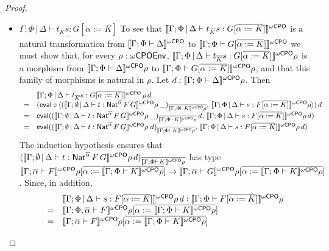 \documentclass[acmsmall,review,anonymous]{acmart}
\theoremstyle{definition}
\begin{document}
\begin{proof}
\begin{itemize}
\item 
$\underline{\Gamma;\Phi \,|\, \Delta \vdash t_{\overline K} s: G
  [\overline{\alpha := K}]}$\; 
  To see that $\llbracket{\Gamma;\Phi \,|\,
  \Delta \vdash t_{\overline K} s: G [\overline{\alpha := K}]}\rrbracket^{{\omega\mathsf{CPO}}}$ is a
  natural transformation from $\llbracket{\Gamma; \Phi \vdash \Delta}\rrbracket^{{\omega\mathsf{CPO}}}$ to
  $\llbracket{\Gamma;\Phi \vdash G [\overline{\alpha := K}]}\rrbracket^{{\omega\mathsf{CPO}}}$ we must
  show that, for every $\rho : \omega\mathsf{CPOEnv}$, $\llbracket{\Gamma;\Phi \,|\,
    \Delta \vdash t_{\overline K} s: G [\overline{\alpha := K}]}\rrbracket^{{\omega\mathsf{CPO}}}\rho$
  is a morphism from $\llbracket{\Gamma; \Phi \vdash \Delta}\rrbracket^{{\omega\mathsf{CPO}}}\rho$ to
  $\llbracket{\Gamma;\Phi \vdash G [\overline{\alpha := K}]}\rrbracket^{{\omega\mathsf{CPO}}}\rho$, and
  that this family of morphisms is natural in $\rho$. Let $d :
  \llbracket{\Gamma; \Phi \vdash \Delta}\rrbracket^{{\omega\mathsf{CPO}}}\rho$. Then
  \[\begin{array}{ll}
  & \llbracket{\Gamma;\Phi \,|\, \Delta \vdash t_{\overline K} s: G
  [\overline{\alpha := K}]}\rrbracket^{{\omega\mathsf{CPO}}}\,\rho\,d\\
= & (\mathsf{eval} \circ \langle (\llbracket{\Gamma; \emptyset \,|\, \Delta \vdash
  t : \mathsf{Nat}^{\overline{\alpha}} \,F \,G}\rrbracket^{{\omega\mathsf{CPO}}}\rho\;
\_)_{\overline{\llbracket{\Gamma;\Phi \vdash K}\rrbracket^{{\omega\mathsf{CPO}}}\rho}},\,
\llbracket{\Gamma;\Phi \,|\, \Delta \vdash s: F [\overline{\alpha :=
      K}]}\rrbracket^{{\omega\mathsf{CPO}}}\rho \rangle)\,d\\
= & \mathsf{eval} ((\llbracket{\Gamma; \emptyset \,|\, \Delta \vdash t :
  \mathsf{Nat}^{\overline{\alpha}} \,F \,G}\rrbracket^{{\omega\mathsf{CPO}}}\rho\;
\_)_{\overline{\llbracket{\Gamma;\Phi \vdash K}\rrbracket^{{\omega\mathsf{CPO}}}\rho}} \,d,\,
\llbracket{\Gamma;\Phi \,|\, \Delta \vdash s: F [\overline{\alpha :=
      K}]}\rrbracket^{{\omega\mathsf{CPO}}}\rho\, d)\\
= & \mathsf{eval} ((\llbracket{\Gamma; \emptyset \,|\, \Delta \vdash t :
  \mathsf{Nat}^{\overline{\alpha}} \,F \,G}\rrbracket^{{\omega\mathsf{CPO}}}\rho\;
d)_{\overline{\llbracket{\Gamma;\Phi \vdash K}\rrbracket^{{\omega\mathsf{CPO}}}\rho}},\,
\llbracket{\Gamma;\Phi \,|\, \Delta \vdash s: F [\overline{\alpha :=
      K}]}\rrbracket^{{\omega\mathsf{CPO}}}\rho\, d)\\
\end{array}\]
The induction hypothesis ensures that $(\llbracket{\Gamma; \emptyset \,|\,
  \Delta \vdash t : \mathsf{Nat}^{\overline{\alpha}} \,F \,G}\rrbracket^{{\omega\mathsf{CPO}}}\rho\,
d)_{\overline{\llbracket{\Gamma;\Phi \vdash K}\rrbracket^{{\omega\mathsf{CPO}}}\rho}}$ has type
$\llbracket{\Gamma; \overline{\alpha} \vdash F}\rrbracket^{{\omega\mathsf{CPO}}}\rho[\overline{\alpha :=
    \llbracket{\Gamma;\Phi \vdash K}\rrbracket^{{\omega\mathsf{CPO}}}\rho}] \to \llbracket{\Gamma;
  \overline{\alpha} \vdash G}\rrbracket^{{\omega\mathsf{CPO}}}\rho[\overline{\alpha := \llbracket{\Gamma;\Phi \vdash
      K}\rrbracket^{{\omega\mathsf{CPO}}}\rho}]$.  Since, in addition, 
\[\begin{array}{ll}
  &\llbracket{\Gamma;\Phi \,|\,
  \Delta \vdash s: F [\overline{\alpha := K}]}\rrbracket^{{\omega\mathsf{CPO}}}\rho\, d :
\llbracket{\Gamma; \Phi \vdash F[\overline{\alpha := K}]}\rrbracket^{{\omega\mathsf{CPO}}}\rho \\ 
  =&\llbracket{\Gamma; \Phi, \overline{\alpha} \vdash F}\rrbracket^{{\omega\mathsf{CPO}}}\rho[\overline{\alpha :=
    \llbracket{\Gamma;\Phi \vdash K}\rrbracket^{{\omega\mathsf{CPO}}}\rho}] \\
    =& \llbracket{\Gamma;
  \overline{\alpha} \vdash F}\rrbracket^{{\omega\mathsf{CPO}}}\rho[\overline{\alpha := \llbracket{\Gamma;\Phi \vdash
      K}\rrbracket^{{\omega\mathsf{CPO}}}\rho}] 
\end{array}\]
      

\end{itemize}
\end{proof}
\end{document}
